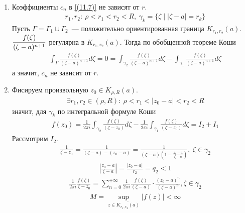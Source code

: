 \pr
~
\begin{enumerate}
    \item Коэффициенты $c_n$ в \eqref{(11.7)} не зависят от $r$.
    \begin{align*}
      & r_1,r_2: \ \rho < r_1 < r_2 < R, \ \gamma_k = \{\zeta \mid \left| \zeta - a \right| = r_k\}
    \end{align*}
    Пусть $\Gamma = \Gamma_1 \cup \Gamma_2$~--- положительно ориентированная
    граница $K_{r_1,r_2}(a)$.
    \\
    $\displaystyle \frac{f(\zeta)}{(\zeta - a)^{n+1}}$ регулярна в $K_{r_1,r_2}(a)$.
    Тогда по обобщенной теореме Коши
    \begin{align*}
      & \int_{\Gamma} \frac{f(\zeta)}{(\zeta - a)^{n+1}}d\zeta = 0 = \int_{\gamma_2} \frac{f(\zeta)}{(\zeta - a)^{n+1}}d\zeta - \int_{\gamma_1} \frac{f(\zeta)}{(\zeta - a)^{n+1}}d\zeta
    \end{align*}
    а значит, $c_n$ не зависит от $r$.
    \item Фисируем произвольную $z_0 \in K_{\rho,R}(a)$.
    \begin{align*}
      & \exists r_1, r_2 \in (\rho,R): \ \rho < r_1 < \left| z_0-a \right|<r_2<R 
    \end{align*}
    значит, для $\gamma_k$ по интегральной формуле Коши
    \begin{align*}
      & f(z_0) = \frac{1}{2\pi i}\int_{\gamma_2} \frac{f(\zeta)}{(\zeta - z_0)}d\zeta - \frac{1}{2\pi i}\int_{\gamma_1} \frac{f(\zeta)}{(\zeta - z_0)}d\zeta = I_2 + I_1
    \end{align*}
    Рассмотрим $I_2$.
    \begin{align*}
      & \frac{1}{\zeta - z_0} = \frac{1}{(\zeta - a) - (z_0-a)} = \frac{1}{(\zeta - a)\left( 1 - \frac{z_0-a}{\zeta-a} \right)}, \ \zeta \in \gamma_2
    \end{align*}
    \begin{align*}
      & \left| \frac{z_0-a}{\zeta - a} \right| = \frac{\left| z_0-a \right|}{r_2} = q_2 < 1
    \end{align*}
    \begin{align*}
      & \frac{1}{2 \pi i}\frac{f(\zeta)}{\zeta - z_0} = \sum_{n=0}^{+\infty}\frac{1}{2\pi i}\frac{f(\zeta)}{(\zeta - a)} \cdot \frac{(z_0-a)^n}{(\zeta - a)^n}, \zeta \in \gamma_2
    \end{align*}
    \begin{align*}
      & M = \sup_{z \in \overline{K_{r_1,r_2}(a)}}\left| f(z) \right|< \infty
    \end{align*}

\end{enumerate}
